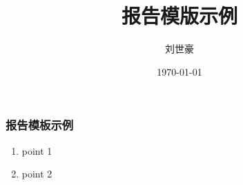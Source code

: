 \documentclass[aspectratio=169,8pt]{beamer}
\title{报告模版示例}
\date[ISPN ’80]{\today}
\author[LiuShihao]{刘世豪}
\begin{document}
\begin{frame}[plain]            %
\titlepage
\end{frame}

\AtEndDocument
{
  \begin{frame}[plain]          %
  \end{frame}
}

\begin{frame}[fragile]
  \frametitle{报告模板示例}
  \begin{enumerate}
  \item point 1
    \bigskip
  \item point 2
    \bigskip
  \end{enumerate}
\end{frame}
\end{document}
